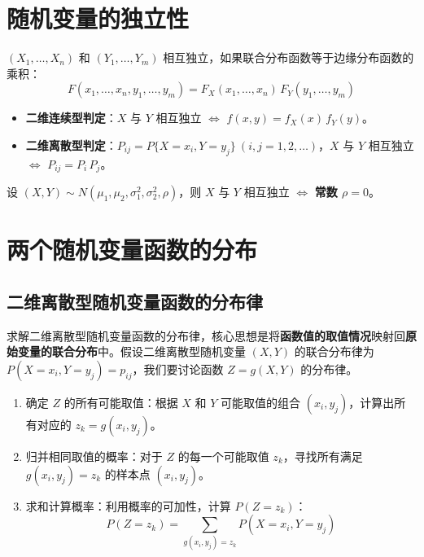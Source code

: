 \section{随机变量的独立性}
\begin{definition}[随机变量的独立性]
$(X_1, \ldots, X_n)$ 和 $(Y_1, \ldots, Y_m)$ 相互独立，如果联合分布函数等于边缘分布函数的乘积：
\begin{equation}
	F(x_1, \ldots, x_n, y_1, \ldots, y_m) = F_X(x_1, \ldots, x_n)\,F_Y(y_1, \ldots, y_m)
	\label{eq:第三章:独立性}
\end{equation}
\begin{itemize}
	\item \textbf{二维连续型判定}：$X$ 与 $Y$ 相互独立 $\Leftrightarrow$ $f(x, y) = f_X(x)\,f_Y(y)$。
	\item \textbf{二维离散型判定}：$P_{ij} = P\{X=x_i, Y=y_j\}\ (i,j=1,2,\dots)$，$X$ 与 $Y$ 相互独立 $\Leftrightarrow$ $P_{ij} = P_i\,P_j$。
\end{itemize}
\end{definition}

\begin{theorem}[二维正态分布的独立性与相关性]
设 $(X, Y) \sim N(\mu_1, \mu_2, \sigma_1^2, \sigma_2^2, \rho)$，则 $X$ 与 $Y$ 相互独立 $\Leftrightarrow$ \textbf{常数 $\rho = 0$}。
\end{theorem}

\section{两个随机变量函数的分布}
\subsection{二维离散型随机变量函数的分布律}
求解二维离散型随机变量函数的分布律，核心思想是将\textbf{函数值的取值情况}映射回\textbf{原始变量的联合分布}中。假设二维离散型随机变量 $(X, Y)$ 的联合分布律为 $P(X=x_i, Y=y_j) = p_{ij}$，我们要讨论函数 $Z = g(X, Y)$ 的分布律。

\begin{property}[求解步骤]
\begin{enumerate}
	\item 确定 $Z$ 的所有可能取值：根据 $X$ 和 $Y$ 可能取值的组合 $(x_i, y_j)$，计算出所有对应的 $z_k = g(x_i, y_j)$。
	\item 归并相同取值的概率：对于 $Z$ 的每一个可能取值 $z_k$，寻找所有满足 $g(x_i, y_j) = z_k$ 的样本点 $(x_i, y_j)$。
	\item 求和计算概率：利用概率的可加性，计算 $P(Z=z_k)$：
	\begin{equation}
		P(Z=z_k) = \sum_{g(x_i, y_j) = z_k} P(X=x_i, Y=y_j)
		\label{eq:第三章:函数分布律}
	\end{equation}
\end{enumerate}
\end{property}

